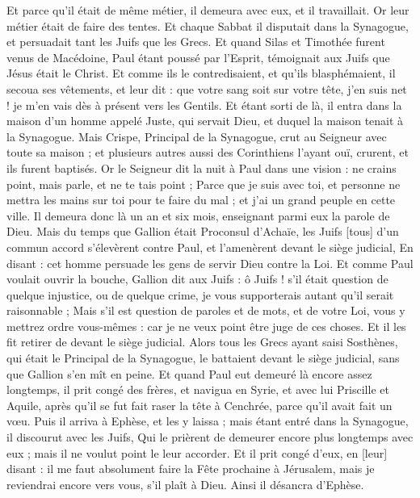\begin{multicols}{2}
Et parce qu'il était de même métier, il demeura avec eux, et il travaillait. Or leur métier était de faire des tentes.
Et chaque Sabbat il disputait dans la Synagogue, et persuadait tant les Juifs que les Grecs.
Et quand Silas et Timothée furent venus de Macédoine, Paul étant poussé par l'Esprit, témoignait aux Juifs que Jésus était le Christ.
Et comme ils le contredisaient, et qu'ils blasphémaient, il secoua ses vêtements, et leur dit : que votre sang soit sur votre tête, j'en suis net ! je m'en vais dès à présent vers les Gentils.
Et étant sorti de là, il entra dans la maison d'un homme appelé Juste, qui servait Dieu, et duquel la maison tenait à la Synagogue.
Mais Crispe, Principal de la Synagogue, crut au Seigneur avec toute sa maison ; et plusieurs autres aussi des Corinthiens l'ayant ouï, crurent, et ils furent baptisés.
Or le Seigneur dit la nuit à Paul dans une vision : ne crains point, mais parle, et ne te tais point ;
Parce que je suis avec toi, et personne ne mettra les mains sur toi pour te faire du mal ; et j'ai un grand peuple en cette ville.
Il demeura donc là un an et six mois, enseignant parmi eux la parole de Dieu.
Mais du temps que Gallion était Proconsul d'Achaïe, les Juifs [tous] d'un commun accord s'élevèrent contre Paul, et l'amenèrent devant le siège judicial,
En disant : cet homme persuade les gens de servir Dieu contre la Loi.
Et comme Paul voulait ouvrir la bouche, Gallion dit aux Juifs : ô Juifs ! s'il était question de quelque injustice, ou de quelque crime, je vous supporterais autant qu'il serait raisonnable ;
Mais s'il est question de paroles et de mots, et de votre Loi, vous y mettrez ordre vous-mêmes : car je ne veux point être juge de ces choses.
Et il les fit retirer de devant le siège judicial.
Alors tous les Grecs ayant saisi Sosthènes, qui était le Principal de la Synagogue, le battaient devant le siège judicial, sans que Gallion s'en mît en peine.
Et quand Paul eut demeuré là encore assez longtemps, il prit congé des frères, et navigua en Syrie, et avec lui Priscille et Aquile, après qu'il se fut fait raser la tête à Cenchrée, parce qu'il avait fait un vœu.
Puis il arriva à Ephèse, et les y laissa ; mais étant entré dans la Synagogue, il discourut avec les Juifs,
Qui le prièrent de demeurer encore plus longtemps avec eux ; mais il ne voulut point le leur accorder.
Et il prit congé d'eux, en [leur] disant : il me faut absolument faire la Fête prochaine à Jérusalem, mais je reviendrai encore vers vous, s'il plaît à Dieu. Ainsi il désancra d'Ephèse.

\end{multicols}
